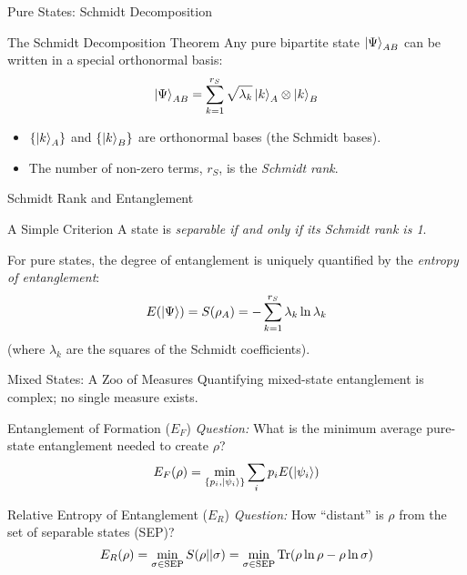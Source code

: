 \begin{frame}{Pure States: Schmidt Decomposition}
  \begin{block}{The Schmidt Decomposition Theorem}
    Any pure bipartite state $\ket{\Psi}_{AB}$ can be written in a special
    orthonormal basis:
    \begin{equation}
      \ket{\Psi}_{AB} = \sum_{k=1}^{r_S} \sqrt{\lambda_k} \ket{k}_A \otimes \ket{k}_B
    \end{equation}
    \begin{itemize}
      \item $\{\ket{k}_A\}$ and $\{\ket{k}_B\}$ are orthonormal bases (the
        Schmidt bases).
      \item The number of non-zero terms, $r_S$, is the \emph{Schmidt rank}.
    \end{itemize}
  \end{block}
\end{frame}

\begin{frame}{Schmidt Rank and Entanglement}
  \begin{alertblock}{A Simple Criterion}
    A state is \emph{separable if and only if its Schmidt rank is 1}.
    \pause

    For pure states, the degree of entanglement is uniquely quantified by the
    \emph{entropy of entanglement}:
    \begin{equation}
      E(\ket{\Psi}) = S(\rho_A) = -\sum_{k=1}^{r_S} \lambda_k \ln \lambda_k
    \end{equation}
    (where $\lambda_k$ are the squares of the Schmidt coefficients).
  \end{alertblock}
\end{frame}

\begin{frame}{Mixed States: A Zoo of Measures}
  Quantifying mixed-state entanglement is complex; no single measure exists.
  \pause
  \begin{block}{Entanglement of Formation (\texorpdfstring{$E_F$}{E\_F})}
    \textit{Question:} What is the minimum average pure-state entanglement
    needed to create $\rho$?
    \[ E_F(\rho) = \min_{\{p_i, \ket{\psi_i}\}} \sum_i p_i E(\ket{\psi_i}) \]
  \end{block}
  \pause
  \begin{block}{Relative Entropy of Entanglement (\texorpdfstring{$E_R$}{E\_R})}
    \textit{Question:} How ``distant'' is $\rho$ from the set of separable states
    (SEP)?
    \[ E_R(\rho) = \min_{\sigma \in \text{SEP}} S(\rho || \sigma) = \min_{\sigma
    \in \text{SEP}} \mathrm{Tr}(\rho \ln \rho - \rho \ln \sigma) \]
  \end{block}
\end{frame}

